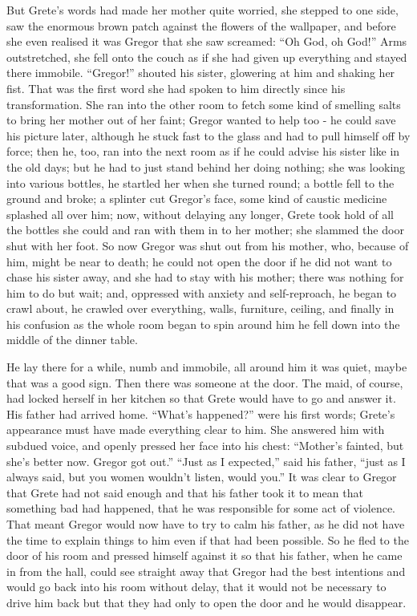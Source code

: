 \documentclass[12pt]{report}
\begin{document}
But Grete's words had made her mother quite worried, she stepped to one
side, saw the enormous brown patch against the flowers of the wallpaper,
and before she even realised it was Gregor that she saw screamed: ``Oh
God, oh God!'' Arms outstretched, she fell onto the couch as if she had
given up everything and stayed there immobile. ``Gregor!'' shouted his
sister, glowering at him and shaking her fist. That was the first word
she had spoken to him directly since his transformation. She ran into
the other room to fetch some kind of smelling salts to bring her mother
out of her faint; Gregor wanted to help too - he could save his picture
later, although he stuck fast to the glass and had to pull himself off
by force; then he, too, ran into the next room as if he could advise his
sister like in the old days; but he had to just stand behind her doing
nothing; she was looking into various bottles, he startled her when she
turned round; a bottle fell to the ground and broke; a splinter cut
Gregor's face, some kind of caustic medicine splashed all over him; now,
without delaying any longer, Grete took hold of all the bottles she
could and ran with them in to her mother; she slammed the door shut with
her foot. So now Gregor was shut out from his mother, who, because of
him, might be near to death; he could not open the door if he did not
want to chase his sister away, and she had to stay with his mother;
there was nothing for him to do but wait; and, oppressed with anxiety
and self-reproach, he began to crawl about, he crawled over everything,
walls, furniture, ceiling, and finally in his confusion as the whole
room began to spin around him he fell down into the middle of the dinner
table.

He lay there for a while, numb and immobile, all around him it was
quiet, maybe that was a good sign. Then there was someone at the door.
The maid, of course, had locked herself in her kitchen so that Grete
would have to go and answer it. His father had arrived home. ``What's
happened?'' were his first words; Grete's appearance must have made
everything clear to him. She answered him with subdued voice, and openly
pressed her face into his chest: ``Mother's fainted, but she's better
now. Gregor got out.'' ``Just as I expected,'' said his father, ``just
as I always said, but you women wouldn't listen, would you.'' It was
clear to Gregor that Grete had not said enough and that his father took
it to mean that something bad had happened, that he was responsible for
some act of violence. That meant Gregor would now have to try to calm
his father, as he did not have the time to explain things to him even if
that had been possible. So he fled to the door of his room and pressed
himself against it so that his father, when he came in from the hall,
could see straight away that Gregor had the best intentions and would go
back into his room without delay, that it would not be necessary to
drive him back but that they had only to open the door and he would
disappear.
\end{document}
